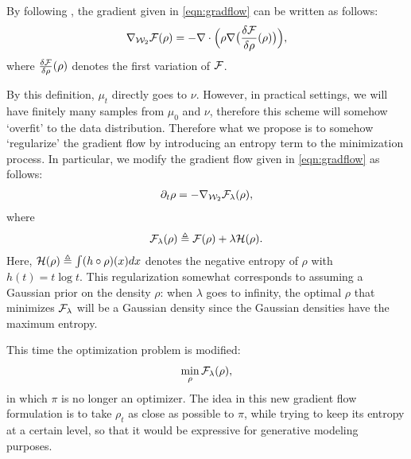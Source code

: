 \documentclass{article}
\newcommand{\W}{{\cal W}_2}
\newcommand{\F}{{\cal F}}
\newcommand{\He}{{\cal H}}
\begin{document}
By following \cite{santambrogio2017euclidean}, the gradient given in \eqref{eqn:gradflow} can be written as follows:
\begin{align}
\nabla_{\W} \F(\rho) = -\nabla \cdot \Bigl( \rho \nabla \bigl( \frac{\delta \F}{\delta \rho}(\rho) \bigr) \Bigr), \label{eqn:gradw2}
\end{align}
where $\frac{\delta \F}{\delta \rho}(\rho)$ denotes the first variation of $\F$.

By this definition, $\mu_t$ directly goes to $\nu$. However, in practical settings, we will have finitely many samples from $\mu_0$ and $\nu$, therefore this scheme will somehow `overfit' to the data distribution. Therefore what we propose is to somehow `regularize' the gradient flow by introducing an entropy term to the minimization process. In particular, we modify the gradient flow given in \eqref{eqn:gradflow} as follows:
\begin{align}
\partial_t \rho = - \nabla_{\W} \F_\lambda(\rho),
\end{align}
where 
\begin{align}
\F_\lambda(\rho) \triangleq \F(\rho) + \lambda \He(\rho).
\end{align}
Here, $\He(\rho) \triangleq \int (h \circ \rho) (x) dx $ denotes the negative entropy of $\rho$ with $h(t) = t \log t$. This regularization somewhat corresponds to assuming a Gaussian prior on the density $\rho$: when $\lambda$ goes to infinity, the optimal $\rho$ that minimizes $\F_\lambda$ will be a Gaussian density since the Gaussian densities have the maximum entropy.

This time the optimization problem is modified: 
\begin{align}
\min_\rho \F_\lambda(\rho),
\end{align}
in which $\pi$ is no longer an optimizer. The idea in this new gradient flow formulation is to take $\rho_t$ as close as possible to $\pi$, while trying to keep its entropy at a certain level, so that it would be expressive for generative modeling purposes.
\end{document}
